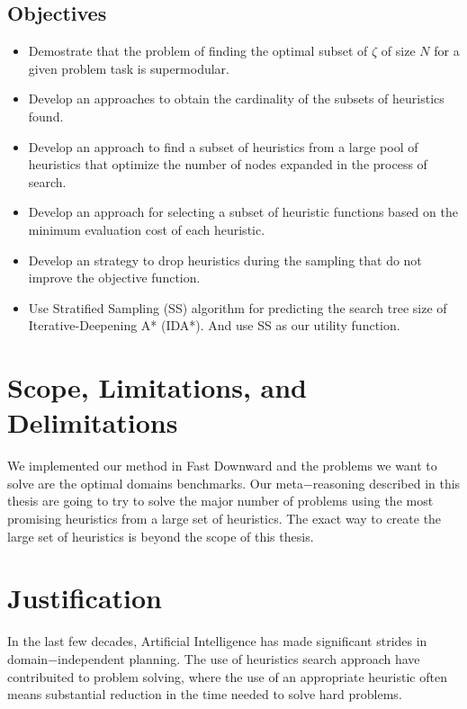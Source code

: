 \subsection{Objectives}
\noindent

\begin{itemize}
  \item Demostrate that the problem of finding the optimal subset of $\zeta$ of size $N$ for a given problem task is supermodular.

  \item Develop an approaches to obtain the cardinality of the subsets of heuristics found.
  
  \item Develop an approach to find a subset of heuristics from a large pool of heuristics that optimize the number of nodes expanded in the process of search.
  
  \item Develop an approach for selecting a subset of heuristic functions based on the minimum evaluation cost of each heuristic.
  
  \item Develop an strategy to drop heuristics during the sampling that do not improve the objective function.  
  
  \item Use Stratified Sampling (SS) algorithm for predicting the search tree size of Iterative-Deepening A* (IDA*). And use SS as our utility function.
   
\end{itemize}
\section{Scope, Limitations, and Delimitations}
\noindent
We implemented our method in Fast Downward \cite{helmert2006fast} and the problems we want to solve are the optimal domains benchmarks.
Our meta$-$reasoning described in this thesis are going to try to solve the major number of problems using the most promising heuristics from a large set of heuristics.
The exact way to create the large set of heuristics is beyond the scope of this thesis.

\section{Justification}
\noindent
In the last few decades, Artificial Intelligence has made significant strides in domain$-$independent planning. The use of heuristics search approach have contribuited to problem solving, where the use of an appropriate heuristic often means substantial reduction in the time needed to solve hard problems.\\

